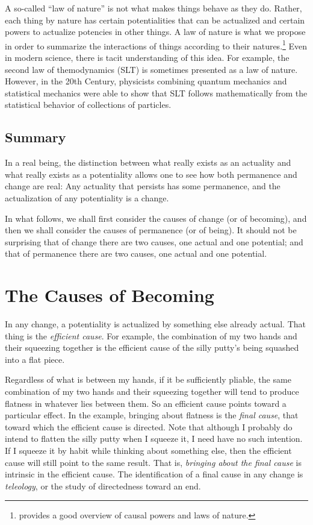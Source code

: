 \documentclass[twocolumn]{article}
\begin{document}
A so-called ``law of nature'' is not what makes things behave as they do.
Rather, each thing by nature has certain potentialities that can be actualized
and certain powers to actualize potencies in other things.  A law of nature is
what we propose in order to summarize the interactions of things according to
their natures.\footnote{%
   \citet[Section 1.2.2.4]{f2014} provides a good overview of causal powers and
   laws of nature.
}
Even in modern science, there is tacit understanding of this idea. For example,
the second law of themodynamics (SLT) is sometimes presented as a law of
nature.  However, in the 20th Century, physicists combining quantum mechanics
and statistical mechanics were able to show that SLT follows mathematically
from the statistical behavior of collections of particles.

\subsection{Summary}

In a real being, the distinction between what really exists as an actuality and
what really exists as a potentiality allows one to see how both permanence and
change are real:  Any actuality that persists has some permanence, and the
actualization of any potentiality is a change.

In what follows, we shall first consider the causes of change (or of becoming),
and then we shall consider the causes of permanence (or of being).  It should
not be surprising that of change there are two causes, one actual and one
potential; and that of permanence there are two causes, one actual and one
potential.

\section{The Causes of Becoming}

In any change, a potentiality is actualized by something else already actual.
That thing is the \emph{efficient cause}.  For example, the combination of my
two hands and their squeezing together is the efficient cause of the silly
putty's being squashed into a flat piece.

Regardless of what is between my hands, if it be sufficiently pliable, the same
combination of my two hands and their squeezing together will tend to produce
flatness in whatever lies between them.  So an efficient cause points toward a
particular effect.  In the example, bringing about flatness is the \emph{final
cause}, that toward which the efficient cause is directed.  Note that although
I probably do intend to flatten the silly putty when I squeeze it, I need have
no such intention.  If I squeeze it by habit while thinking about something
else, then the efficient cause will still point to the same result.  That is,
\emph{bringing about the final cause} is intrinsic in the efficient cause.  The
identification of a final cause in any change is \emph{teleology}, or the study
of directedness toward an end.
\end{document}
